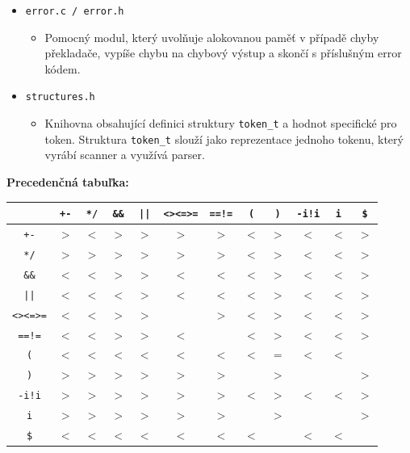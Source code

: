 {\begin{itemize}
\begin{itemize}
    \end{itemize}
    \newpage
    \item \verb|error.c / error.h|
    \begin{itemize}
        \item Pomocný modul, který uvolňuje alokovanou paměť v případě chyby překladače, vypíše chybu na chybový výstup a skončí s příslušným error kódem.
    \end{itemize}
    \item \verb|structures.h|
    \begin{itemize}
        \item Knihovna obsahující definici struktury \verb|token_t| a hodnot specifické pro token. Struktura \verb|token_t| slouží jako reprezentace jednoho tokenu, který vyrábí scanner a využívá parser.
    \end{itemize}
\end{itemize}

\newpage
\noindent\textbf{Precedenčná tabuľka:}\\
\vspace{0.75em}
\begin{tabular}{|c|c|c|c|c|c|c|c|c|c|c|c|}
\hline
 & \texttt{+-} & \texttt{*/} & \texttt{\&\&} & \texttt{||} & \texttt{<><=>=} & \texttt{==!=} & \texttt{(} & \texttt{)} & \texttt{-i!i} & \texttt{i} & \texttt{\$} \\ \hline
\texttt{+-}     & $>$ & $<$ & $>$ & $>$ & $>$ & $>$ & $<$ & $>$ & $<$ & $<$ & $>$ \\ \hline
\texttt{*/}     & $>$ & $>$ & $>$ & $>$ & $>$ & $>$ & $<$ & $>$ & $<$ & $<$ & $>$ \\ \hline
\texttt{\&\&}   & $<$ & $<$ & $>$ & $>$ & $<$ & $<$ & $<$ & $>$ & $<$ & $<$ & $>$ \\ \hline
\texttt{||}     & $<$ & $<$ & $<$ & $>$ & $<$ & $<$ & $<$ & $>$ & $<$ & $<$ & $>$ \\ \hline
\texttt{<><=>=} & $<$ & $<$ & $>$ & $>$ &     & $>$ & $<$ & $>$ & $<$ & $<$ & $>$ \\ \hline
\texttt{==!=}   & $<$ & $<$ & $>$ & $>$ & $<$ &     & $<$ & $>$ & $<$ & $<$ & $>$ \\ \hline
\texttt{(}      & $<$ & $<$ & $<$ & $<$ & $<$ & $<$ & $<$ & $=$ & $<$ & $<$ &     \\ \hline
\texttt{)}      & $>$ & $>$ & $>$ & $>$ & $>$ & $>$ &     & $>$ &     &     & $>$ \\ \hline
\texttt{-i!i}   & $>$ & $>$ & $>$ & $>$ & $>$ & $>$ & $<$ & $>$ & $<$ & $<$ & $>$ \\ \hline
\texttt{i}      & $>$ & $>$ & $>$ & $>$ & $>$ & $>$ &     & $>$ &     &     & $>$ \\ \hline
\texttt{\$}     & $<$ & $<$ & $<$ & $<$ & $<$ & $<$ & $<$ &     & $<$ & $<$ &     \\ \hline
\end{tabular}
}